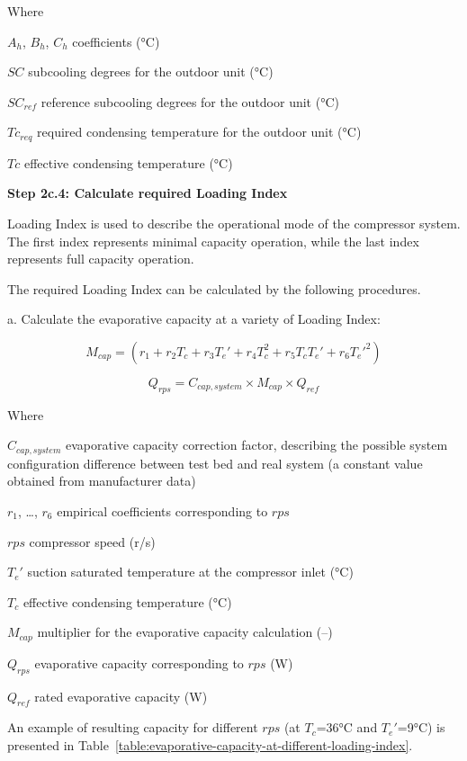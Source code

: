 Where	

$A_h$, $B_h$, $C_h$ coefficients (°C)

$SC$ subcooling degrees for the outdoor unit (°C)

$SC_{ref}$ reference subcooling degrees for the outdoor unit (°C)

$Tc_{req}$ required condensing temperature for the outdoor unit (°C)

$Tc$ effective condensing temperature (°C)

\textbf{Step 2c.4: Calculate required Loading Index}

Loading Index is used to describe the operational mode of the compressor system. The first index represents minimal capacity operation, while the last index represents full capacity operation. 

The required Loading Index can be calculated by the following procedures. 

a. Calculate the evaporative capacity at a variety of Loading Index:

\begin{equation}M_{cap}=(r_1+r_2T_c+r_3{T_e}'+r_4T_c^2+r_5T_c{T_e}'+r_6{T_e}'^2)\end{equation}

\begin{equation}Q_{rps}=C_{cap,system} \times M_{cap} \times Q_{ref} \end{equation}

Where	

$C_{cap,system}$ evaporative capacity correction factor, describing the possible system configuration difference between test bed and real system (a constant value obtained from manufacturer data)  

$r_1$, \ldots, $r_6$ empirical coefficients corresponding to $rps$  

$rps$	compressor speed (r/s) 

${T_e}'$ suction saturated temperature at the compressor inlet (°C)

$T_c$	effective condensing temperature (°C)

$M_{cap}$	multiplier for the evaporative capacity calculation (--)

$Q_{rps}$	evaporative capacity corresponding to $rps$ (W) 

$Q_{ref}$	rated evaporative capacity (W) 

An example of resulting capacity for different $rps$ (at $T_c$=36°C and ${T_e}'$=9°C) is presented in Table~\ref{table:evaporative-capacity-at-different-loading-index}.

